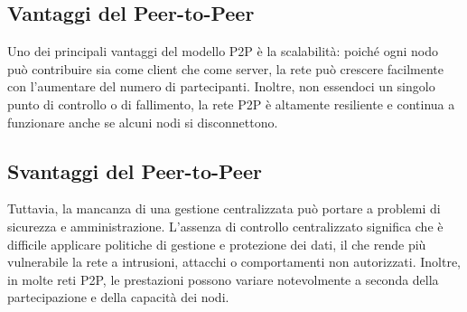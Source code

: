 \documentclass[12pt]{report}
\begin{document}
	\subsection{Vantaggi del Peer-to-Peer}
	Uno dei principali vantaggi del modello P2P è la scalabilità: poiché ogni nodo può contribuire sia come client che come server, la rete può crescere facilmente con l'aumentare del numero di partecipanti. Inoltre, non essendoci un singolo punto di controllo o di fallimento, la rete P2P è altamente resiliente e continua a funzionare anche se alcuni nodi si disconnettono.

	\subsection{Svantaggi del Peer-to-Peer}
	Tuttavia, la mancanza di una gestione centralizzata può portare a problemi di sicurezza e amministrazione. L'assenza di controllo centralizzato significa che è difficile applicare politiche di gestione e protezione dei dati, il che rende più vulnerabile la rete a intrusioni, attacchi o comportamenti non autorizzati. Inoltre, in molte reti P2P, le prestazioni possono variare notevolmente a seconda della partecipazione e della capacità dei nodi.
\end{document}
